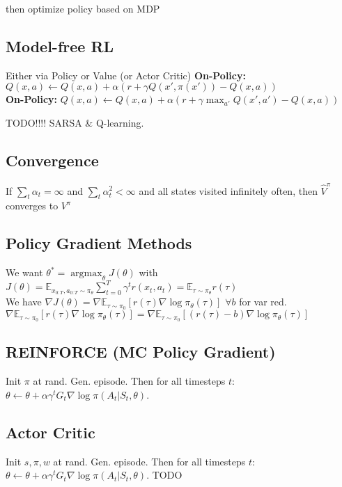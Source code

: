 \documentclass[11pt]{article}
\newcommand{\argmax}{\operatorname{argmax}}
\newcommand{\E}{\mathbb{E}}
\begin{document}
\begin{multicols*}{3}
then optimize policy based on MDP



\subsection*{Model-free RL}
Either via Policy or Value (or Actor Critic)
\textbf{On-Policy:} $Q(x,a) \leftarrow Q(x,a) + \alpha (r + \gamma Q(x',\pi(x')) -Q(x,a) )$\\
\textbf{On-Policy:} $Q(x,a) \leftarrow Q(x,a) + \alpha (r + \gamma \max_{a'} Q(x',a') - Q(x,a) )$

TODO!!!! SARSA \& Q-learning.

\subsection*{Convergence}
If $\sum_t \alpha_t = \infty$ and $\sum_t \alpha_t^2 < \infty$ and all states visited infinitely often, then $\hat{V}^\pi$ converges to $V^\pi$ 


\subsection*{Policy Gradient Methods}
We want $\theta^* = \argmax_\theta J(\theta) $ with\\
 $J(\theta) = \E_{x_{0:T},a_{0:T} \sim \pi_\theta }\sum_{t=0}^{T} \gamma^t r(x_t,a_t) = \E_{\tau \sim \pi_\theta} r(\tau)$\\
 We have $\nabla J(\theta) = \nabla \E_{\tau \sim \pi_0}[r(\tau) \nabla \log \pi_\theta (\tau)]$ $\forall b$ for var red.\\
 $\nabla \E_{\tau \sim \pi_0}[r(\tau) \nabla \log \pi_\theta (\tau)] = \nabla \E_{\tau \sim \pi_0}[(r(\tau)-b) \nabla \log \pi_\theta (\tau)]$
 
\subsection*{REINFORCE (MC Policy Gradient)}
Init $\pi$ at rand. Gen. episode. Then for all timesteps $t$: $\theta \leftarrow \theta + \alpha \gamma^t G_t \nabla \log \pi (A_t|S_t,\theta)$.

\subsection*{Actor Critic}
Init $s,\pi,w$ at rand. Gen. episode. Then for all timesteps $t$: $\theta \leftarrow \theta + \alpha \gamma^t G_t \nabla \log \pi (A_t|S_t,\theta)$. TODO




\end{multicols*}
\end{document}
